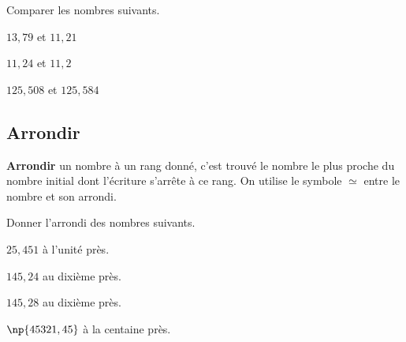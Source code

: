 \documentclass[a4paper]{book}
\begin{document}
    \begin{exemple}
        Comparer les nombres suivants.

        \medskip

        \begin{minipage}{0.30\linewidth}
            $13,79$ et $11,21$
            
            \vspace{2cm}
        \end{minipage}
        \hfill\vline\hfill
        \begin{minipage}{0.30\linewidth}
            $11,24$ et $11,2$
            
            \vspace{2cm}
        \end{minipage}
        \hfill\vline\hfill
        \begin{minipage}{0.30\linewidth}
            $125,508$ et $125,584$
            
            \vspace{2cm}
        \end{minipage}
    \end{exemple}


\subsection{Arrondir}
    \begin{definition}
        \textbf{Arrondir} un nombre à un rang donné, c'est trouvé le nombre le plus proche du nombre initial dont l'écriture s'arrête à ce rang. On utilise le symbole $\simeq$ entre le nombre et son arrondi.
    \end{definition}


    \begin{exemple}
        Donner l'arrondi des nombres suivants.

        \medskip

        \begin{minipage}{0.24\linewidth}
            $25,451$ à l'unité près.
            
            \vspace{2cm}
        \end{minipage}
        \hfill\vline\hfill
        \begin{minipage}{0.24\linewidth}
            $145,24$ au dixième près.
            
            \vspace{2cm}
        \end{minipage}
        \hfill\vline\hfill
        \begin{minipage}{0.24\linewidth}
            $145,28$ au dixième près.
            
            \vspace{2cm}
        \end{minipage}
        \hfill\vline\hfill
        \begin{minipage}{0.24\linewidth}
            $\np{45321,45}$ à la centaine près.
            
            \vspace{2cm}
        \end{minipage}
    \end{exemple}
    
\end{document}
